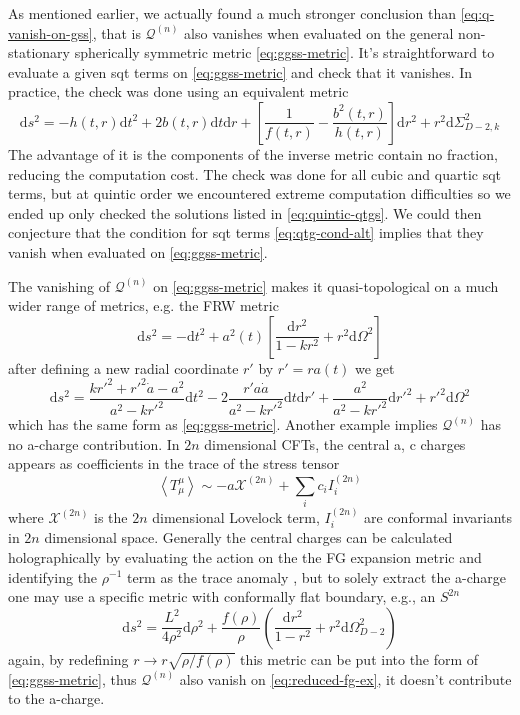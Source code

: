 \documentclass[a4paper,11pt]{article}
\newcommand{\dd}{{\mathrm d}}
\begin{document}
As mentioned earlier, we actually found a much stronger conclusion than \eqref{eq:q-vanish-on-gss}, that is $\mathcal Q^{(n)}$ also vanishes when evaluated on the general non-stationary spherically symmetric metric \eqref{eq:ggss-metric}. It's straightforward to evaluate a given \ac{sqt} terms on \eqref{eq:ggss-metric} and check that it vanishes. In practice, the check was done using an equivalent metric
\begin{equation}\label{eq:ggss-metric-alt1}
    \dd s^2 = -h(t, r)\dd t^2 + 2b(t, r)\dd t\dd r + \left[\frac{1}{f(t, r)} - \frac{b^2(t, r)}{h(t, r)}\right]\dd r^2 + r^2\dd\Sigma_{D-2, k}^2
\end{equation}
The advantage of it is the components of the inverse metric contain no fraction, reducing the computation cost. The check was done for all cubic and quartic \ac{sqt} terms, but at quintic order we encountered extreme computation difficulties so we ended up only checked the solutions listed in \eqref{eq:quintic-qtgs}. We could then conjecture that the condition for \ac{sqt} terms \eqref{eq:qtg-cond-alt} implies that they vanish when evaluated on \eqref{eq:ggss-metric}.

The vanishing of $\mathcal Q^{(n)}$ on \eqref{eq:ggss-metric} makes it quasi-topological on a much wider range of metrics, e.g. the FRW metric
\begin{equation}
    \dd s^2 = -\dd t^2 + a^2(t)\left[\frac{\dd r^2}{1 - kr^2} + r^2\dd\Omega^2\right]
\end{equation}
after defining a new radial coordinate $r'$ by $r' = r a(t)$ we get
\begin{equation}
    \dd s^2 = \frac{kr'^2 + r'^2\dot a - a^2}{a^2 - kr'^2}\dd t^2 - 2\frac{r' a \dot a}{a^2 - k r'^2}\dd t \dd r' + \frac{a^2}{a^2 - k r'^2}\dd r'^2 + r'^2 \dd\Omega^2
\end{equation}
which has the same form as \eqref{eq:ggss-metric}. Another example implies $\mathcal Q^{(n)}$ has no a-charge contribution. In $2n$ dimensional CFTs, the central a, c charges appears as coefficients in the trace of the stress tensor \cite{weyl-anomaly}
\begin{equation}
    \left\langle T^\mu_\mu\right\rangle \sim -a \mathcal X^{(2n)} + \sum_i c_i I_i^{(2n)}
\end{equation}
where $\mathcal X^{(2n)}$ is the $2n$ dimensional Lovelock term, $I_i^{(2n)}$ are conformal invariants in $2n$ dimensional space. Generally the central charges can be calculated holographically by evaluating the action on the the FG expansion metric and identifying the $\rho^{-1}$ term as the trace anomaly \cite{fg-expansion-weyl}, but to solely extract the a-charge one may use a specific metric with conformally flat boundary, e.g., an $S^{2n}$ \cite{lyz2}
\begin{equation}\label{eq:reduced-fg-ex}
    \dd s^2 = \frac{L^2}{4\rho^2}\dd\rho^2 + \frac{f(\rho)}{\rho}\left(\frac{\dd r^2}{1 - r^2} + r^2 \dd\Omega_{D - 2}^2\right)
\end{equation}
again, by redefining $r \to r \sqrt{\rho / f(\rho)}$ this metric can be put into the form of \eqref{eq:ggss-metric}, thus $\mathcal Q^{(n)}$ also vanish on \eqref{eq:reduced-fg-ex}, it doesn't contribute to the a-charge.
\end{document}

